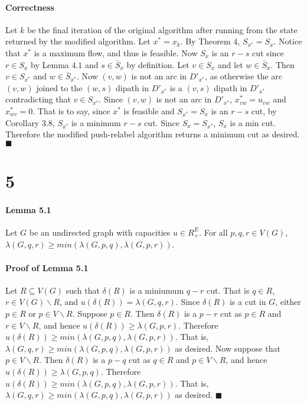 \documentclass[letterpaper,12pt,oneside,onecolumn]{article}
\begin{document}
\paragraph{Correctness}
Let $k$ be the final iteration of the original algorithm after running from the state returned by the modified algorithm. Let $x^* = x_k$. By Theorem $4$, $S_{x^*} = S_x$. Notice that $x^*$ is a maximum flow, and thus is feasible. Now $S_x$ is an $r-s$ cut since $r \in S_x$ by Lemma $4.1$ and $s \in \bar{S}_x$ by definition. Let $v \in S_x$ and let $w \in \bar{S}_x$. Then $v \in S_{x^*}$ and $w \in \bar{S}_{x^*}$. Now $(v,w)$ is not an arc in $D'_{x^*}$, as otherwise the arc $(v,w)$ joined to the $(w,s)$ dipath in $D'_{x^*}$ is a $(v,s)$ dipath in $D'_{x^*}$ contradicting that $v \in S_{x^*}$. Since $(v,w)$ is not an arc in $D'_{x^*}$, $x^*_{vw} = u_{vw}$ and $x^*_{wv} = 0$. That is to say, since $x^*$ is feasible and $S_{x^*} = S_x$ is an $r-s$ cut, by Corollary $3.8$, $S_{x^*}$ is a minimum $r-s$ cut. Since $S_x = S_{x^*}$, $S_x$ is a min cut. Therefore the modified push-relabel algorithm returns a minimum cut as desired. $\blacksquare$

\section*{5}
\paragraph{Lemma 5.1}
Let $G$ be an undirected graph with capacities $u \in R_+^E$. For all $p,q,r \in V(G)$, $\lambda(G, q,r) \geq min(\lambda(G,p,q), \lambda(G, p,r))$.
\paragraph{Proof of Lemma 5.1}
Let $R \subseteq V(G)$ such that $\delta(R)$ is a miniumum $q-r$ cut. That is $q \in R$, $r\in V(G) \backslash R$, and $u(\delta(R)) = \lambda(G,q,r)$. Since $\delta(R)$ is a cut in $G$, either $p \in R$ or $p \in V \backslash R$. Suppose $p \in R$. Then $\delta(R)$ is a $p-r$ cut as $p \in R$ and $r \in V \backslash R$, and hence $u(\delta(R)) \geq \lambda(G,p,r)$. Therefore $u(\delta(R)) \geq min(\lambda(G,p,q), \lambda(G,p,r))$. That is, $\lambda(G,q,r) \geq min(\lambda(G,p,q),\lambda(G,p,r))$ as desired. Now suppose that $p \in V\backslash R$. Then $\delta(R)$ is a $p-q$ cut as $q \in R$ and $p \in V\backslash R$, and hence $u(\delta(R)) \geq \lambda(G,p,q)$. Therefore $u(\delta(R)) \geq min(\lambda(G,p,q), \lambda(G,p,r))$. That is, $\lambda(G,q,r) \geq min(\lambda(G,p,q), \lambda(G,p,r))$ as desired. $\blacksquare$
\end{document}
